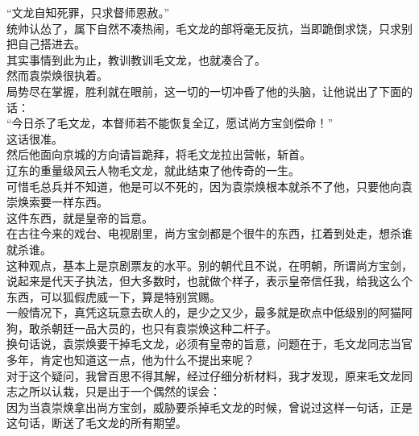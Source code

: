 \begin{multicols}{\theparacolNo}
“文龙自知死罪，只求督师恩赦。”\\

统帅认怂了，属下自然不凑热闹，毛文龙的部将毫无反抗，当即跪倒求饶，只求别把自己搭进去。\\

其实事情到此为止，教训教训毛文龙，也就凑合了。\\

然而袁崇焕很执着。\\

局势尽在掌握，胜利就在眼前，这一切的一切冲昏了他的头脑，让他说出了下面的话：\\

“今日杀了毛文龙，本督师若不能恢复全辽，愿试尚方宝剑偿命！”\\

这话很准。\\

然后他面向京城的方向请旨跪拜，将毛文龙拉出营帐，斩首。\\

辽东的重量级风云人物毛文龙，就此结束了他传奇的一生。\\

可惜毛总兵并不知道，他是可以不死的，因为袁崇焕根本就杀不了他，只要他向袁崇焕索要一样东西。\\

这件东西，就是皇帝的旨意。\\

在古往今来的戏台、电视剧里，尚方宝剑都是个很牛的东西，扛着到处走，想杀谁就杀谁。\\

这种观点，基本上是京剧票友的水平。别的朝代且不说，在明朝，所谓尚方宝剑，说起来是代天子执法，但大多数时，也就做个样子，表示皇帝信任我，给我这么个东西，可以狐假虎威一下，算是特别赏赐。\\

一般情况下，真凭这玩意去砍人的，是少之又少，最多就是砍点中低级别的阿猫阿狗，敢杀朝廷一品大员的，也只有袁崇焕这种二杆子。\\

换句话说，袁崇焕要干掉毛文龙，必须有皇帝的旨意，问题在于，毛文龙同志当官多年，肯定也知道这一点，他为什么不提出来呢？\\

对于这个疑问，我曾百思不得其解，经过仔细分析材料，我才发现，原来毛文龙同志之所以认栽，只是出于一个偶然的误会：\\

因为当袁崇焕拿出尚方宝剑，威胁要杀掉毛文龙的时候，曾说过这样一句话，正是这句话，断送了毛文龙的所有期望。\\


\end{multicols}
